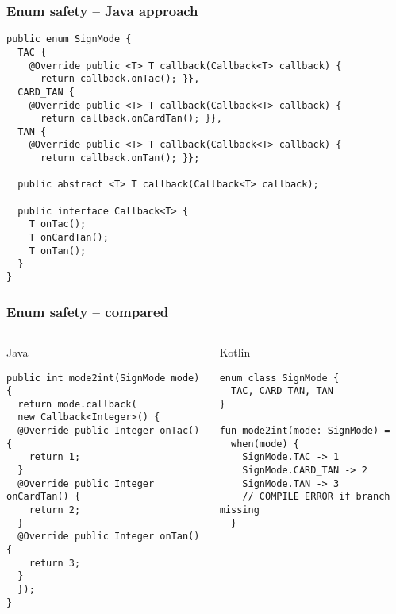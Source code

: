 \begin{frame}[fragile] \frametitle{Enum safety -- Java approach}
\begin{lstlisting}[basicstyle=\color{IJ_text}\ttfamily\tiny]
public enum SignMode {
  TAC {
    @Override public <T> T callback(Callback<T> callback) {
      return callback.onTac(); }},
  CARD_TAN {
    @Override public <T> T callback(Callback<T> callback) {
      return callback.onCardTan(); }},
  TAN {
    @Override public <T> T callback(Callback<T> callback) {
      return callback.onTan(); }};

  public abstract <T> T callback(Callback<T> callback);

  public interface Callback<T> {
    T onTac();
    T onCardTan();
    T onTan();
  }
}

\end{lstlisting}
\end{frame}

\begin{frame}[fragile]
\frametitle{Enum safety -- compared}
\begin{columns}[t]
\begin{column}{0.5\textwidth}
\begin{center}
  Java
\end{center}
\begin{lstlisting}[style=twosided]
public int mode2int(SignMode mode) {
  return mode.callback(
  new Callback<Integer>() {
  @Override public Integer onTac() {
    return 1;
  }
  @Override public Integer onCardTan() {
    return 2;
  }
  @Override public Integer onTan() {
    return 3;
  }
  });
}
\end{lstlisting}
\end{column}
\begin{column}{0.5\textwidth}
\begin{center}
  Kotlin
\end{center}
\begin{lstlisting}[style=twosided]
enum class SignMode {
  TAC, CARD_TAN, TAN
}

fun mode2int(mode: SignMode) =
  when(mode) {
    SignMode.TAC -> 1
    SignMode.CARD_TAN -> 2
    SignMode.TAN -> 3
    // COMPILE ERROR if branch missing
  }
\end{lstlisting}
\end{column}
\end{columns}
\end{frame}




